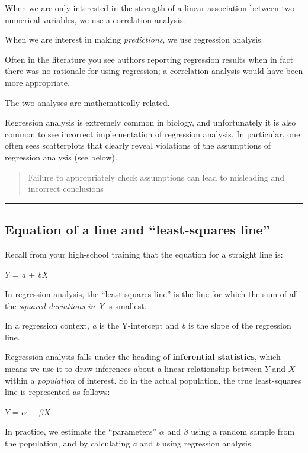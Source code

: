 \documentclass[
]{book}
\begin{document}
When we are only interested in the strength of a linear association between two numerical variables, we use a \hyperref[two_num]{correlation analysis}.

When we are interest in making \emph{predictions}, we use regression analysis.

Often in the literature you see authors reporting regression results when in fact there was no rationale for using regression; a correlation analysis would have been more appropriate.

The two analyses are mathematically related.

Regression analysis is extremely common in biology, and unfortunately it is also common to see incorrect implementation of regression analysis. In particular, one often sees scatterplots that clearly reveal violations of the assumptions of regression analysis (see below).

\begin{quote}
Failure to appropriately check assumptions can lead to misleading and incorrect conclusions
\end{quote}

\begin{center}\rule{0.5\linewidth}{0.5pt}\end{center}

\subsection{Equation of a line and ``least-squares line''}\label{LSR_line}

Recall from your high-school training that the equation for a straight line is:

\(Y\) = \emph{a} + \emph{bX}

In regression analysis, the ``least-squares line'' is the line for which the sum of all the \emph{squared deviations in Y} is smallest.

In a regression context, \emph{a} is the Y-intercept and \emph{b} is the slope of the regression line.

Regression analysis falls under the heading of \textbf{inferential statistics}, which means we use it to draw inferences about a linear relationship between \(Y\) and \(X\) within a \emph{population} of interest. So in the actual population, the true least-squares line is represented as follows:

\(Y\) = \(\alpha\) + \(\beta\)\(X\)

In practice, we estimate the ``parameters'' \(\alpha\) and \(\beta\) using a random sample from the population, and by calculating \emph{a} and \emph{b} using regression analysis.
\end{document}

